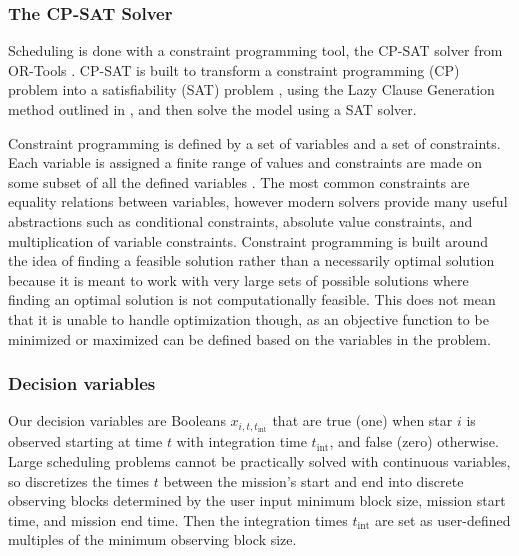 \subsubsection{The CP-SAT Solver}

Scheduling is done with a constraint programming tool, the CP-SAT solver from
OR-Tools \citep{perronORTools2022}. CP-SAT is built to transform a constraint
programming (CP) problem into a satisfiability (SAT) problem
\citep{knuthSatisfiablility2018}, using the Lazy Clause Generation method
outlined in \citet{feydyLazyClause2009a}, and then solve the model using a SAT
solver.


Constraint programming is defined by a set of variables and a set of
constraints. Each variable is assigned a finite range of values and constraints
are made on some subset of all the defined variables
\citep{shawConstraintProgramming2002}. The most common constraints are equality
relations between variables, however modern solvers provide many useful
abstractions such as conditional constraints, absolute value constraints, and
multiplication of variable constraints. Constraint programming is built around
the idea of finding a feasible solution rather than a necessarily optimal
solution because it is meant to work with very large sets of possible solutions
where finding an optimal solution is not computationally feasible. This does
not mean that it is unable to handle optimization though, as an objective
function to be minimized or maximized can be defined based on the variables in
the problem.





\subsubsection{Decision variables}

Our decision variables are Booleans $x_{i, t, t_{\textrm{int}}}$ that are true
(one) when star $i$ is observed starting at time $t$ with integration time
$t_{\textrm{int}}$, and false (zero) otherwise. Large scheduling problems
cannot be practically solved with continuous variables, so 
discretizes the times $t$ between the mission's start and end into discrete
observing blocks determined by the user input minimum block size, mission start
time, and mission end time. Then the integration times $t_{\textrm{int}}$ are
set as user-defined multiples of the minimum observing block size.

